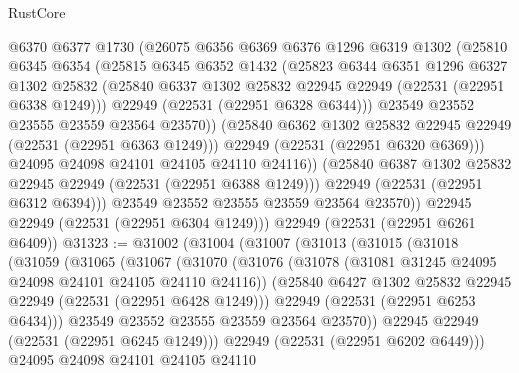 \begin{lexlean}{RustCore}
\begin{coremodule}
                @6370
                @6377
                @1730
                (@26075
                  @6356
                  @6369
                  @6376
                  @1296
                  @6319
                  @1302
                  (@25810
                    @6345
                    @6354
                    (@25815
                      @6345
                      @6352
                      @1432
                      (@25823
                        @6344
                        @6351
                        @1296
                        @6327
                        @1302
                        @25832
                        (@25840 @6337 @1302 @25832 @22945 @22949 (@22531 (@22951 @6338 @1249)))
                        @22949
                        (@22531 (@22951 @6328 @6344)))
                      @23549
                      @23552
                      @23555
                      @23559
                      @23564
                      @23570))
                  (@25840 @6362 @1302 @25832 @22945 @22949 (@22531 (@22951 @6363 @1249)))
                  @22949
                  (@22531 (@22951 @6320 @6369)))
                @24095
                @24098
                @24101
                @24105
                @24110
                @24116))
            (@25840 @6387 @1302 @25832 @22945 @22949 (@22531 (@22951 @6388 @1249)))
            @22949
            (@22531 (@22951 @6312 @6394)))
          @23549
          @23552
          @23555
          @23559
          @23564
          @23570))
      @22945
      @22949
      (@22531 (@22951 @6304 @1249)))
    @22949
    (@22531 (@22951 @6261 @6409))
@31323 := @31002
    (@31004
      (@31007
        (@31013
          (@31015
            (@31018
              (@31059
                (@31065
                  (@31067
                    (@31070
                      (@31076
                        (@31078 (@31081 @31245 @24095 @24098 @24101 @24105 @24110 @24116))
                        (@25840 @6427 @1302 @25832 @22945 @22949 (@22531 (@22951 @6428 @1249)))
                        @22949
                        (@22531 (@22951 @6253 @6434)))
                      @23549
                      @23552
                      @23555
                      @23559
                      @23564
                      @23570))
                  @22945
                  @22949
                  (@22531 (@22951 @6245 @1249)))
                @22949
                (@22531 (@22951 @6202 @6449)))
              @24095
              @24098
              @24101
              @24105
              @24110

\end{coremodule}
\end{lexlean}
